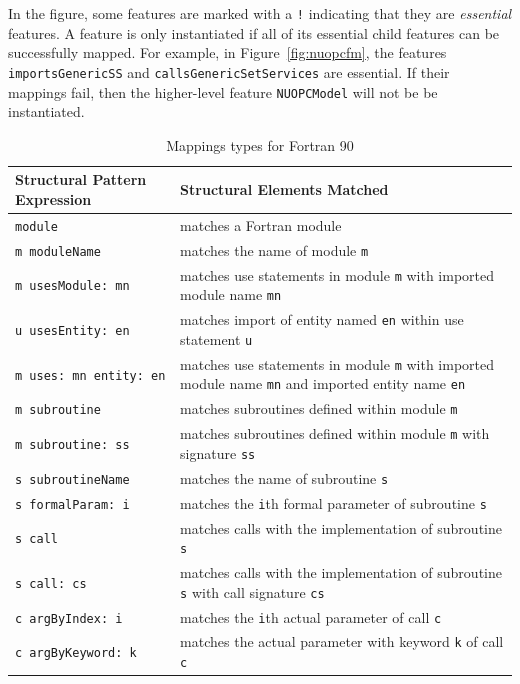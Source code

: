 \documentclass[oneside,11pt]{memoir}
\begin{document}

In the figure, some features are marked with a \texttt{!} indicating that they are \emph{essential} features. A feature is only instantiated if all of its essential child features can be successfully mapped. For example, in Figure~\ref{fig:nuopcfm}, the features \texttt{importsGenericSS} and \texttt{callsGenericSetServices} are essential. If their mappings fail, then the higher-level feature \texttt{NUOPCModel} will not be be instantiated.

{
\footnotesize
\begin{table}
\caption{Mappings types for Fortran 90}
\label{tab:mappings}
\begin{center}
    \begin{tabular}{| l | p{8cm} |}
		\hline
    \textbf{Structural Pattern Expression} & \textbf{Structural Elements Matched} \\ \hline
		\texttt{module} & matches a Fortran module \\ \hline
		\texttt{m moduleName} & matches the name of module \texttt{m} \\ \hline
		\texttt{m usesModule: mn} & matches use statements in module \texttt{m} with imported module name \texttt{mn} \\ \hline
		\texttt{u usesEntity: en} & matches import of entity named \texttt{en} within use statement \texttt{u} \\ \hline
		\texttt{m uses: mn entity: en} & matches use statements in module \texttt{m} with imported module name \texttt{mn} and imported entity name \texttt{en} \\ \hline
		\texttt{m subroutine} & matches subroutines defined within module \texttt{m} \\ \hline
		\texttt{m subroutine: ss} & matches subroutines defined within module \texttt{m} with signature \texttt{ss} \\ \hline
		\texttt{s subroutineName} & matches the name of subroutine \texttt{s} \\ \hline
		\texttt{s formalParam: i} & matches the \texttt{i}th formal parameter of subroutine \texttt{s} \\ \hline
		\texttt{s call} & matches calls with the implementation of subroutine \texttt{s} \\ \hline
		\texttt{s call: cs} & matches calls with the implementation of subroutine \texttt{s} with call signature \texttt{cs}\\ \hline
		\texttt{c argByIndex: i} & matches the \texttt{i}th actual parameter of call \texttt{c} \\ \hline
		\texttt{c argByKeyword: k} & matches the actual parameter with keyword \texttt{k} of call \texttt{c} \\ \hline
    \end{tabular}
\end{center}
\end{table}
}
\end{document}
